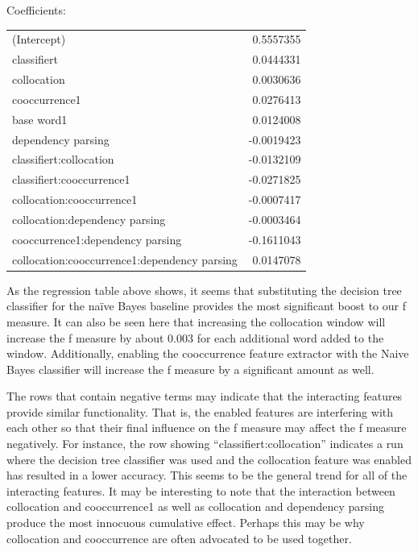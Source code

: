 \documentclass{article}
\newcommand{\naive}{na\"ive}
\begin{document}
Coefficients:

\begin{tabular}{l r}
                                (Intercept) & 0.5557355 \\
                                classifiert & 0.0444331  \\
                                 collocation & 0.0030636  \\
                              cooccurrence1 & 0.0276413 \\
                                 base word1 & 0.0124008  \\
                         dependency parsing & -0.0019423 \\
                     classifiert:collocation & -0.0132109 \\
                  classifiert:cooccurrence1 & -0.0271825 \\
                   collocation:cooccurrence1 & -0.0007417 \\
              collocation:dependency parsing & -0.0003464 \\
           cooccurrence1:dependency parsing & -0.1611043 \\
collocation:cooccurrence1:dependency parsing & 0.0147078  \\
\end{tabular}

As the regression table above shows, it seems that substituting the
decision tree classifier for the \naive{} Bayes baseline provides the
most significant boost to our f measure. It can also be seen here that
increasing the collocation window will increase the f measure by about 0.003
for each additional word added to the window. Additionally, enabling
the cooccurrence feature extractor with the Naive Bayes classifier
will increase the f measure by a significant amount as well.

The rows that contain negative terms may indicate that the interacting
features provide similar functionality. That is, the enabled features
are interfering with each other so that their final influence on the f
measure may affect the f measure negatively. For instance, the row
showing ``classifiert:collocation'' indicates a run where the decision
tree classifier was used and the collocation feature was enabled has
resulted in a lower accuracy. This seems to be the general trend for
all of the interacting features. It may be interesting to note that
the interaction between collocation and cooccurrence1 as well as
collocation and dependency parsing produce the most innocuous
cumulative effect. Perhaps this may be why collocation and
cooccurrence are often advocated to be used together.
\end{document}
